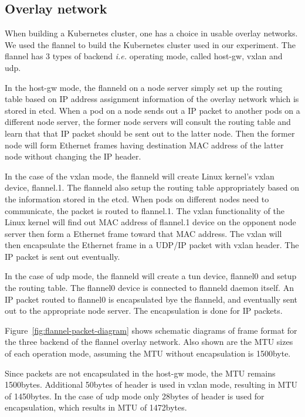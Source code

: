 \subsection{Overlay network}

When building a Kubernetes cluster, one has a choice in usable overlay networks.
We used the flannel to build the Kubernetes cluster used in our experiment. 
The flannel has 3 types of backend {\it i.e.} operating mode, called host-gw, vxlan and udp\cite{CoreOSFlannelBackend}.

In the host-gw mode, the flanneld on a node server simply set up the routing table 
based on IP address assignment information of the overlay network which is stored in etcd. 
When a pod on a node sends out a IP packet to another pods on a different node server, 
the former node servers will consult the routing table and learn that that IP packet should be sent out to the latter node.
Then the former node will form Ethernet frames having destination MAC address of the latter node without changing the IP header.

In the case of the vxlan mode, the flanneld will create Linux kernel's vxlan device, flannel.1. 
The flanneld also setup the routing table appropriately based on the information stored in the etcd.
When pods on different nodes need to communicate, the packet is routed to flannel.1.
The vxlan functionality of the Linux kernel will find out MAC address of flannel.1 device on the opponent node server 
then form a Ethernet frame toward that MAC address.
The vxlan will then encapsulate the Ethernet frame in a UDP/IP packet with vxlan header.
The IP packet is sent out eventually.

In the case of udp mode, the flanneld will create a tun device, flannel0 and setup the routing table.
The flannel0 device is connected to flanneld daemon itself.
An IP packet routed to flannel0 is encapsulated bye the flanneld, and eventually sent out 
to the appropriate node server. 
The encapsulation is done for IP packets.

Figure~\ref{fig:flannel-packet-diagram} shows schematic diagrams of frame format for the three backend of 
the flannel overlay network.
Also shown are the MTU sizes of each operation mode, assuming the MTU without encapsulation is 1500byte.

Since packets are not encapsulated in the host-gw mode, the MTU remains 1500bytes.
Additional 50bytes of header is used in vxlan mode, resulting in MTU of 1450bytes.
In the case of udp mode only 28bytes of header is used for encapsulation, which results in MTU of 1472bytes.



